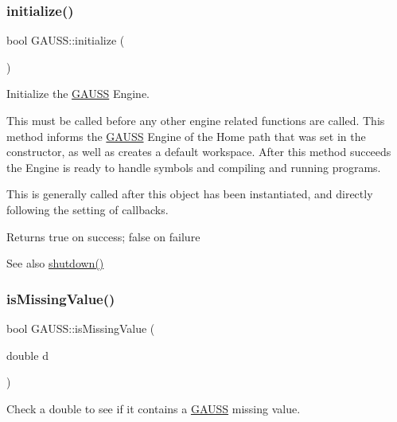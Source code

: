 \subsubsection{\texorpdfstring{initialize()}{initialize()}}
{\footnotesize\ttfamily bool G\+A\+U\+S\+S\+::initialize (\begin{DoxyParamCaption}{ }\end{DoxyParamCaption})}



Initialize the \hyperlink{class_g_a_u_s_s}{G\+A\+U\+SS} Engine. 

This must be called before any other engine related functions are called. This method informs the \hyperlink{class_g_a_u_s_s}{G\+A\+U\+SS} Engine of the Home path that was set in the constructor, as well as creates a default workspace. After this method succeeds the Engine is ready to handle symbols and compiling and running programs.

This is generally called after this object has been instantiated, and directly following the setting of callbacks.

\begin{DoxyReturn}{Returns}
true on success; false on failure
\end{DoxyReturn}
\begin{DoxySeeAlso}{See also}
\hyperlink{class_g_a_u_s_s_a71721c595c12c94616ef414879c95460}{shutdown()} 
\end{DoxySeeAlso}
\mbox{\label{class_g_a_u_s_s_a3e665b3b7d0733f27ca56427e6ec3d49}} 
\subsubsection{\texorpdfstring{is\+Missing\+Value()}{isMissingValue()}}
{\footnotesize\ttfamily bool G\+A\+U\+S\+S\+::is\+Missing\+Value (\begin{DoxyParamCaption}\item[{double}]{d }\end{DoxyParamCaption})\hspace{0.3cm}{\ttfamily [static]}}



Check a double to see if it contains a \hyperlink{class_g_a_u_s_s}{G\+A\+U\+SS} missing value. 


